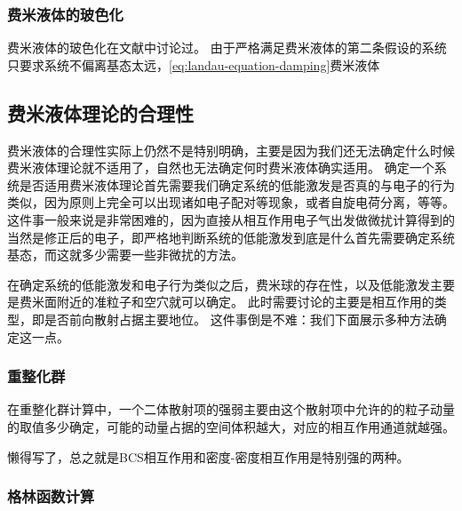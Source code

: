 
\subsubsection{费米液体的玻色化}

费米液体的玻色化在文献\cite{haldane-boson, Castro_Neto_1994}中讨论过。
由于严格满足费米液体的第二条假设的系统只要求系统不偏离基态太远，\eqref{eq:landau-equation-damping}费米液体

\subsection{费米液体理论的合理性}\label{sec:why-fermi-liquid-works}

费米液体的合理性实际上仍然不是特别明确，主要是因为我们还无法确定什么时候费米液体理论就不适用了，自然也无法确定何时费米液体确实适用。
确定一个系统是否适用费米液体理论首先需要我们确定系统的低能激发是否真的与电子的行为类似，因为原则上完全可以出现诸如电子配对等现象，或者自旋电荷分离，等等。
这件事一般来说是非常困难的，因为直接从相互作用电子气出发做微扰计算得到的当然是修正后的电子，即严格地判断系统的低能激发到底是什么首先需要确定系统基态，而这就多少需要一些非微扰的方法。

在确定系统的低能激发和电子行为类似之后，费米球的存在性，以及低能激发主要是费米面附近的准粒子和空穴就可以确定。
此时需要讨论的主要是相互作用的类型，即是否前向散射占据主要地位。
这件事倒是不难：我们下面展示多种方法确定这一点。

\subsubsection{重整化群}

在重整化群计算中，一个二体散射项的强弱主要由这个散射项中允许的的粒子动量的取值多少确定，可能的动量占据的空间体积越大，对应的相互作用通道就越强。

懒得写了，总之就是BCS相互作用和密度-密度相互作用是特别强的两种。

\subsubsection{格林函数计算}

